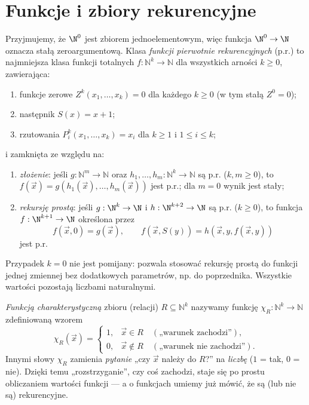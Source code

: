 \section{Funkcje i zbiory rekurencyjne}\label{sec:funkcje-rekurencyjne}
\begin{definicja}\label{res:5:1}
Przyjmujemy, że $\N^0$ jest zbiorem jednoelementowym, więc funkcja $\N^0\to\N$ oznacza stałą zeroargumentową. Klasa \emph{funkcji pierwotnie rekurencyjnych} (p.r.) to najmniejsza klasa funkcji totalnych $f:\mathbb N^k\to\mathbb N$ dla wszystkich arności $k\ge0$, zawierająca:
\begin{enumerate}[label=(\roman*)]
\item funkcje zerowe $Z^k(x_1,\ldots,x_k)=0$ dla każdego $k\ge0$ (w tym stałą $Z^0=0$);
\item następnik $S(x)=x+1$;
\item rzutowania $P_i^k(x_1,\ldots,x_k)=x_i$ dla $k\ge1$ i $1\le i\le k$;
\end{enumerate}
i zamknięta ze względu na:
\begin{enumerate}[label=(\alph*)]
\item \emph{złożenie}: jeśli $g:\mathbb N^m\to\mathbb N$ oraz $h_1,\ldots,h_m:\mathbb N^k\to\mathbb N$ są p.r. ($k,m\ge0$), to $f(\vec x)=g(h_1(\vec x),\ldots,h_m(\vec x))$ jest p.r.; dla $m=0$ wynik jest stały;
\item \emph{rekursję prostą}: jeśli $g:\N^k\to\N$ i $h:\N^{k+2}\to\N$ są p.r. ($k\ge0$), to funkcja $f:\N^{k+1}\to\N$ określona przez
\[
f(\vec x,0)=g(\vec x),\qquad f(\vec x,S(y))=h(\vec x,y,f(\vec x,y))
\]
jest p.r.
\end{enumerate}
Przypadek $k=0$ nie jest pomijany: pozwala stosować rekursję prostą do funkcji jednej zmiennej bez dodatkowych parametrów, np. do poprzednika. Wszystkie wartości pozostają liczbami naturalnymi.
\end{definicja}

\begin{definicja}\label{res:5:2}
\emph{Funkcją charakterystyczną} zbioru (relacji) $R\subseteq\mathbb N^k$ nazywamy funkcję $\chi_R:\mathbb N^k\to\mathbb N$ zdefiniowaną wzorem
\[
\chi_R(\vec x)=\begin{cases}1,&\vec x\in R\quad(\text{„warunek zachodzi”}),\\0,&\vec x\notin R\quad(\text{„warunek nie zachodzi”}).\end{cases}
\]
Innymi słowy $\chi_R$ zamienia \emph{pytanie} „czy $\vec x$ należy do $R$?” na \emph{liczbę} ($1$ = tak, $0$ = nie). Dzięki temu „rozstrzyganie”, czy coś zachodzi, staje się po prostu obliczaniem wartości funkcji --- a o funkcjach umiemy już mówić, że są (lub nie są) rekurencyjne.
\end{definicja}

